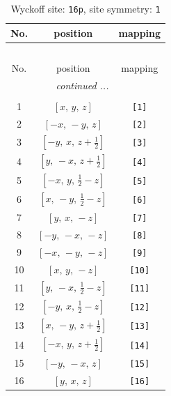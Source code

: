 \documentclass[fleqn,8pt]{jsarticle}
\begin{document}
\begin{longtable}{ccc}
\caption{Wyckoff site: {\tt 16p}, site symmetry: {\tt 1}}
 \\
 \hline \hline
No. & position & mapping \\ \hline \endfirsthead

\multicolumn{2}{l}{\tablename\ \thetable{}} \\
 \hline \hline
No. & position & mapping \\ \hline \endhead

 \hline \hline
\multicolumn{2}{r}{\footnotesize\it continued ...} \\ \endfoot

 \hline \hline
\multicolumn{2}{r}{} \\ \endlastfoot

1 & $\left[ x,\, y,\, z \right]$ & {\tt [1]} \\ \hline
2 & $\left[ - x,\, - y,\, z \right]$ & {\tt [2]} \\ \hline
3 & $\left[ - y,\, x,\, z + \frac{1}{2} \right]$ & {\tt [3]} \\ \hline
4 & $\left[ y,\, - x,\, z + \frac{1}{2} \right]$ & {\tt [4]} \\ \hline
5 & $\left[ - x,\, y,\, \frac{1}{2} - z \right]$ & {\tt [5]} \\ \hline
6 & $\left[ x,\, - y,\, \frac{1}{2} - z \right]$ & {\tt [6]} \\ \hline
7 & $\left[ y,\, x,\, - z \right]$ & {\tt [7]} \\ \hline
8 & $\left[ - y,\, - x,\, - z \right]$ & {\tt [8]} \\ \hline
9 & $\left[ - x,\, - y,\, - z \right]$ & {\tt [9]} \\ \hline
10 & $\left[ x,\, y,\, - z \right]$ & {\tt [10]} \\ \hline
11 & $\left[ y,\, - x,\, \frac{1}{2} - z \right]$ & {\tt [11]} \\ \hline
12 & $\left[ - y,\, x,\, \frac{1}{2} - z \right]$ & {\tt [12]} \\ \hline
13 & $\left[ x,\, - y,\, z + \frac{1}{2} \right]$ & {\tt [13]} \\ \hline
14 & $\left[ - x,\, y,\, z + \frac{1}{2} \right]$ & {\tt [14]} \\ \hline
15 & $\left[ - y,\, - x,\, z \right]$ & {\tt [15]} \\ \hline
16 & $\left[ y,\, x,\, z \right]$ & {\tt [16]} \\
\end{longtable}
\end{document}
